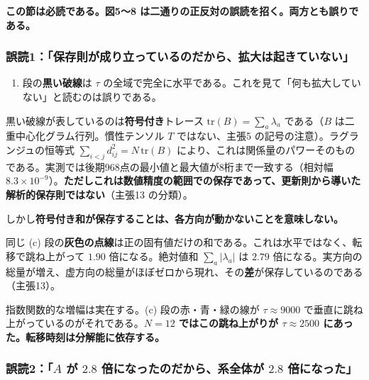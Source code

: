 \documentclass[
  10pt,
]{ltjsarticle}
\providecommand{\tightlist}{%
  \setlength{\itemsep}{0pt}\setlength{\parskip}{0pt}}
\begin{document}
\textbf{この節は必読である。図5〜8
は二通りの正反対の誤読を招く。両方とも誤りである。}

\subsubsection{誤読1：「保存則が成り立っているのだから、拡大は起きていない」}\label{ux8aa4ux8aad1ux4fddux5b58ux5247ux304cux6210ux308aux7acbux3063ux3066ux3044ux308bux306eux3060ux304bux3089ux62e1ux5927ux306fux8d77ux304dux3066ux3044ux306aux3044}

\begin{enumerate}
\def\labelenumi{(\alph{enumi})}
\setcounter{enumi}{2}
\tightlist
\item
  段の\textbf{黒い破線}は \(\tau\)
  の全域で完全に水平である。これを見て「何も拡大していない」と読むのは誤りである。
\end{enumerate}

黒い破線が表しているのは\textbf{符号付き}トレース
\(\mathrm{tr}(B) = \sum_a \lambda_a\) である（\(B\)
は二重中心化グラム行列。慣性テンソル \(T\) ではない、主張5
の記号の注意）。ラグランジュの恒等式
\(\sum_{i<j}d_{ij}^2 = N\,\mathrm{tr}(B)\)
により、これは関係量のパワーそのものである。実測では後期968点の最小値と最大値が8桁まで一致する（相対幅
\(8.3\times10^{-9}\)）。\textbf{ただしこれは数値精度の範囲での保存であって、更新則から導いた解析的保存則ではない}（主張13
の分類）。

しかし\textbf{符号付き和が保存することは、各方向が動かないことを意味しない。}

同じ (c)
段の\textbf{灰色の点線}は正の固有値だけの和である。これは水平ではなく、転移で跳ね上がって
\(1.90\) 倍になる。絶対値和 \(\sum_a|\lambda_a|\) は \(2.79\)
倍になる。実方向の総量が増え、虚方向の総量がほぼゼロから現れ、その\textbf{差}が保存しているのである（主張13）。

指数関数的な増幅は実在する。(c) 段の赤・青・緑の線が
\(\tau \approx 9000\)
で垂直に跳ね上がっているのがそれである。\textbf{\(N=12\)
ではこの跳ね上がりが \(\tau \approx 2500\)
にあった。転移時刻は分解能に依存する。}

\subsubsection{\texorpdfstring{誤読2：「\(A\) が \(2.8\)
倍になったのだから、系全体が \(2.8\)
倍になった」}{誤読2：「A が 2.8 倍になったのだから、系全体が 2.8 倍になった」}}\label{ux8aa4ux8aad2a-ux304c-2.8-ux500dux306bux306aux3063ux305fux306eux3060ux304bux3089ux7cfbux5168ux4f53ux304c-2.8-ux500dux306bux306aux3063ux305f}
\end{document}
